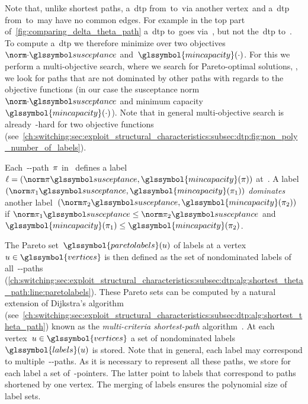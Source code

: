 Note that, unlike shortest paths, a~\gls{dtp} from~\source to~\sink via another
vertex~\vertexb and a~\gls{dtp} from~\source to~\vertexb may have no common
edges. For example in the top part
of~\cref{fig:comparing_delta_theta_path} a~\gls{dtp} to~\vertexb goes
via~\vertexa, but not the~\gls{dtp} to~\sink. To compute a~\gls{dtp} we
therefore minimize over two objectives~$\bnorm{\cdot}$
and~$\glssymbol{mincapacity}(\cdot)$. For this we perform a multi-objective
search, where we search for Pareto-optimal solutions, \ie, we look for paths
that are not dominated by other paths with regards to the objective functions
(in our case the susceptance norm~$\bnorm{\cdot}$ and minimum
capacity~$\glssymbol{mincapacity}(\cdot)$). Note that in general multi-objective
search is already~\NP-hard for two objective functions~\parencite{Gar79}
(see~\cref{ch:switching:sec:exploit_structural_characteristics:subsec:dtp:fig:non_poly_number_of_labels}).
%
\begin{definition}
    Each~\source-\vertexa-path~$\pi$ in~ defines a
    label~$\lab=(\bnorm{\pathu},\glssymbol{mincapacity}(\pathu))$ at~\vertexa.
    A label~$(\bnorm{\pathu_1}, \glssymbol{mincapacity}(\pathu_1))$
    \emph{dominates} another label~$(\bnorm{\pathu_2},
    \glssymbol{mincapacity}(\pathu_2))$ if
    $\bnorm{\pathu_1}\leq\bnorm{\pathu_2}$ and
    $\glssymbol{mincapacity}(\pathu_1)\le\glssymbol{mincapacity}(\pathu_2)$. 
\end{definition}
% 
% 
The Pareto set~$\glssymbol{paretolabels}(\vertexa)$ of labels at a
vertex~$\vertexa\in\glssymbol{vertices}$ is then defined as the set of
nondominated labels of all~\source-\vertexa-paths
(\cref{ch:switching:sec:exploit_structural_characteristics:subsec:dtp:alg:shortest_theta_path:line:paretolabels}).
%
These Pareto sets can be computed by a natural extension of Dijkstra's algorithm
(see~\cref{ch:switching:sec:exploit_structural_characteristics:subsec:dtp:alg:shortest_theta_path})
known as the
% 
\emph{multi-criteria shortest-path} algorithm~\parencite{MARTINS1984236}. At
each vertex~$\vertexa\in\glssymbol{vertices}$ a set of nondominated labels~$
\glssymbol{labels}(\vertexa)$
% 
is stored. Note that in general, each label may correspond to 
% 
multiple~\source-\vertexa-paths. As it is necessary to represent all these
paths, we store for each label a set of~\parent-pointers. The latter point to
labels that correspond to paths shortened by one vertex. The merging of labels
ensures the polynomial size of label sets.

